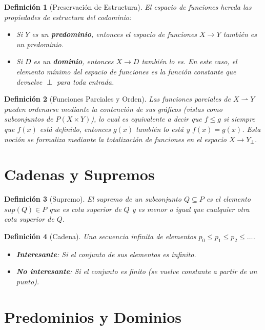 \documentclass{article}
\newtheorem{definition}{Definición}
\begin{document}
\begin{definition}[Preservación de Estructura]
El espacio de funciones hereda las propiedades de estructura del codominio:
\begin{itemize}
    \item Si $Y$ es un \textbf{predominio}, entonces el espacio de funciones $X \to Y$ también es un predominio.
    \item Si $D$ es un \textbf{dominio}, entonces $X \to D$ también lo es. En este caso, el elemento mínimo del espacio de funciones es la función constante que devuelve $\perp$ para toda entrada.
\end{itemize}
\end{definition}

\begin{definition}[Funciones Parciales y Orden]
Las funciones parciales de $X \rightharpoonup Y$ pueden ordenarse mediante la contención de sus gráficos (vistas como subconjuntos de $P(X \times Y)$), lo cual es equivalente a decir que $f \le g$ si siempre que $f(x)$ está definido, entonces $g(x)$ también lo está y $f(x) = g(x)$. Esta noción se formaliza mediante la totalización de funciones en el espacio $X \to Y_{\perp}$.
\end{definition}

\section{Cadenas y Supremos}

\begin{definition}[Supremo]
El supremo de un subconjunto $Q \subseteq P$ es el elemento $sup(Q) \in P$ que es cota superior de $Q$ y es menor o igual que cualquier otra cota superior de $Q$.
\end{definition}

\begin{definition}[Cadena]
Una secuencia infinita de elementos $p_0 \le p_1 \le p_2 \le \dots$. 
\begin{itemize}
    \item \textbf{Interesante}: Si el conjunto de sus elementos es infinito.
    \item \textbf{No interesante}: Si el conjunto es finito (se vuelve constante a partir de un punto).
\end{itemize}
\end{definition}

\section{Predominios y Dominios}
\end{document}
